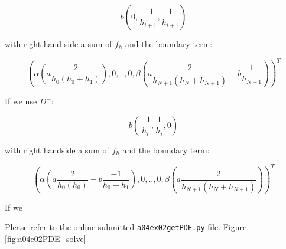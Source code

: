 $$
b(0,\frac{-1}{h_{i+1}},\frac{1}{h_{i+1}})
$$

with right hand side a sum of $f_h$ and the boundary term:

$$
(\alpha(a\frac{2}{h_0(h_0+h_{1})}),0,..,0,\beta(a\frac{2}{h_{N+1}(h_N+h_{N+1})}-b\frac{1}{h_{N+1}}))^T
$$


If we use $D^-$:

$$
b(\frac{-1}{h_{i}},\frac{1}{h_{i}},0)
$$

with right handside a sum of $f_h$ and the boundary term:

$$
(\alpha(a\frac{2}{h_0(h_0)}-b\frac{-1}{h_0+h_1}),0,..,0,\beta(a\frac{2}{h_{N+1}(h_N+h_{N+1})}))^T
$$


If we 

Please refer to the online submitted \texttt{a04ex02getPDE.py} file. Figure \ref{fig:a04e02PDE_solve}

%
%

%

%

%
